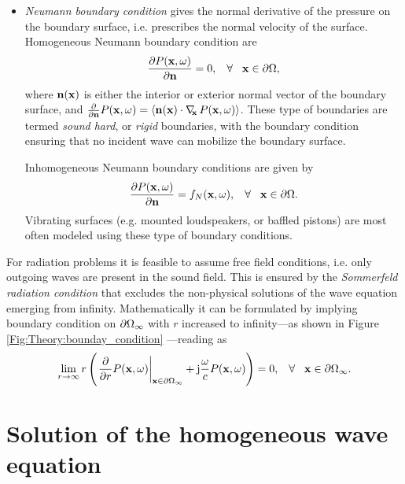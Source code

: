 \begin{itemize}
\item \emph{Neumann boundary condition} gives the normal derivative of the pressure on the boundary surface, i.e. prescribes the normal velocity of the surface.
Homogeneous Neumann boundary condition are
\begin{equation}
\frac{\partial P(\mathbf{x},\omega)}{\partial \mathbf{n}} = 0, \hspace{3mm} \forall \hspace{3mm}  \mathbf{x} \in \partial \Omega,
\end{equation}
where $ \mathbf{n}(\mathbf{x}) $ is either the interior or exterior normal vector of the boundary surface, and $\frac{\partial}{\partial \mathbf{n}} P(\mathbf{x},\omega) = \left< \mathbf{n}(\mathbf{x}) \cdot \nabla_{\!\!\mathbf{x}}\, P(\mathbf{x},\omega) \right>$.
These type of boundaries are termed \emph{sound hard}, or \emph{rigid} boundaries, with the boundary condition ensuring that no incident wave can mobilize the boundary surface.

Inhomogeneous Neumann boundary conditions are given by
\begin{equation}
\frac{\partial P(\mathbf{x},\omega)}{\partial \mathbf{n}} = f_N(\mathbf{x},\omega), \hspace{3mm} \forall \hspace{3mm}  \mathbf{x} \in \partial \Omega.
\end{equation}
Vibrating surfaces (e.g. mounted loudspeakers, or baffled pistons) are most often modeled using these type of boundary conditions.
\end{itemize}

For radiation problems it is feasible to assume free field conditions, i.e. only outgoing waves are present in the sound field. 
This is ensured by the \emph{Sommerfeld radiation condition} that excludes the non-physical solutions of the wave equation emerging from infinity.
Mathematically it can be formulated by implying boundary condition on $\partial \Omega_{\infty}$ with $r$ increased to infinity---as shown in Figure \ref{Fig:Theory:bounday_condition} \cite{Schot1992:Eighty_years, Williams1999}---reading as
\begin{equation}
\lim_{r \rightarrow \infty} r \left( \left. \frac{\partial}{\partial r}P(\mathbf{x},\omega)\right|_{\mathbf{x} \in \partial \Omega_{\infty}} +\mathrm{j} \frac{\omega}{c}P(\mathbf{x},\omega) \right) = 0, \hspace{3mm} \forall \hspace{3mm} \mathbf{x} \in \partial \Omega_{\infty}.
\label{Eq:Theory:Sommerfeld_radiation_condition}
\end{equation}


\section{Solution of the homogeneous wave equation}

